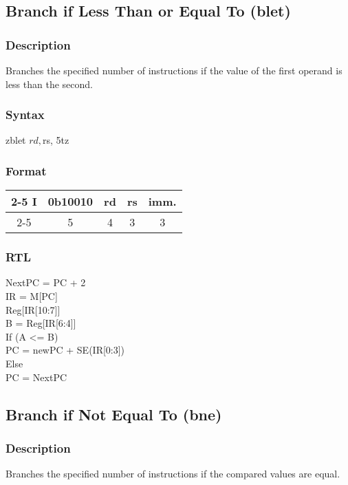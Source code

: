 \documentclass[12pt, a4paper]{report}
\begin{document}
	\subsection{Branch if Less Than or Equal To (blet)}
	\subsubsection{Description}
	Branches the specified number of instructions if the value of the first operand is less than the second.
	\subsubsection{Syntax}
	zblet   $rd, $rs, 5tz %
	\subsubsection{Format}
	\begin{center}
		{\renewcommand{\arraystretch}{1.5}
			\begin{tabular}[b]{c @{ } c | c | c | c|}
				\cline{2-5}
				I & \vline \hspace{1.5pt} 0b10010 & rd & rs & imm. \\
				\cline{2-5}
				\multicolumn{1}{}{} & \multicolumn{1}{c}{5} & \multicolumn{1}{c}{4}
				& \multicolumn{1}{c}{3} & \multicolumn{1}{c}{3}
			\end{tabular}}
	\end{center}
	\subsubsection{RTL}
	NextPC = PC + 2 \\
	IR = M[PC] \\
	Reg[IR[10:7]] \\
	B = Reg[IR[6:4]] \\
	If (A  <=  B) \\
	PC = newPC + SE(IR[0:3]) \\
	Else \\
	PC = NextPC \\
	
	\subsection{Branch if Not Equal To (bne)}
	\subsubsection{Description}
	Branches the specified number of instructions if the compared values are equal.
\end{document}
